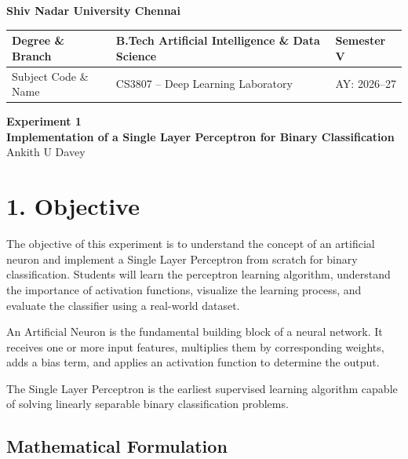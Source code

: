 \documentclass[11pt,a4paper]{article}
\begin{document}
\begin{center}
\Large\textbf{Shiv Nadar University Chennai}\\[2mm]
\end{center}

\renewcommand{\arraystretch}{1.4}

\begin{tabular}{|p{3.5cm}|p{8cm}|p{2cm}|}
\hline
Degree \& Branch & B.Tech Artificial Intelligence \& Data Science & Semester V\\ \hline
Subject Code \& Name & CS3807 -- Deep Learning Laboratory & AY: 2026--27\\ \hline
\end{tabular}

\vspace{3mm}

\begin{center}
\Large\textbf{Experiment 1}\\
\large\textbf{Implementation of a Single Layer Perceptron for Binary Classification}\\[3mm]
\normalsize Ankith U Davey 
\end{center}


\section*{1. Objective}

The objective of this experiment is to understand the concept of an artificial neuron and implement a Single Layer Perceptron from scratch for binary classification. Students will learn the perceptron learning algorithm, understand the importance of activation functions, visualize the learning process, and evaluate the classifier using a real-world dataset.




An Artificial Neuron is the fundamental building block of a neural network. It receives one or more input features, multiplies them by corresponding weights, adds a bias term, and applies an activation function to determine the output.

The Single Layer Perceptron is the earliest supervised learning algorithm capable of solving linearly separable binary classification problems.

\subsection*{Mathematical Formulation}
\end{document}

